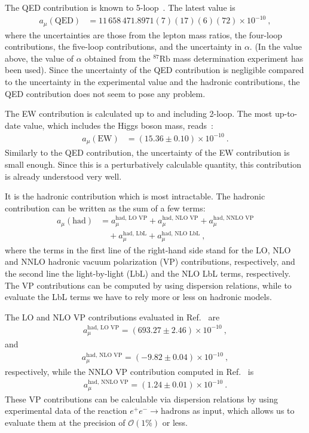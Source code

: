 The QED contribution is known to 5-loop~\cite{Aoyama-etal-2017}. 
The latest value is
%
\begin{align}
 a_\mu(\text{QED}) &=
  11 \, 658 \, 471.8971 (7)(17)(6)(72) \times 10^{-10} ~,
\label{eq:a_mu_QED}
\end{align}
%
where the uncertainties are those from the lepton mass ratios,
the four-loop contributions, the five-loop contributions,
and the uncertainty in $\alpha$.  (In the value above, the
value of $\alpha$ obtained from the ${}^{87}\text{Rb}$ mass
determination experiment has been used).  Since the uncertainty
of the QED contribution is negligible compared to the uncertainty 
in the experimental value and the hadronic contributions,
the QED contribution does not seem to pose any problem.


The EW contribution is calculated up to and including
2-loop.  The most up-to-date value, which includes 
the Higgs boson mass, reads~\cite{Gnendiger-etal}:
%
\begin{align}
 a_\mu(\text{EW}) &=  (15.36 \pm 0.10) \times 10^{-10} ~.
\label{eq:a_mu_EW}
\end{align}
%
Similarly to the QED contribution, the uncertainty of the EW
contribution is small enough.  Since this is a perturbatively
calculable quantity, this contribution is already understood
very well.

It is the hadronic contribution which is most intractable.
The hadronic contribution can be written as the sum of a 
few terms:
%
\begin{align}
   a_\mu(\text{had})
&= a_\mu^{\text{had, LO VP}} +  a_\mu^{\text{had, NLO VP}}
+  a_\mu^{\text{had, NNLO VP}} \nonumber \\
%
&\quad + a_\mu^{\text{had, LbL}} +  a_\mu^{\text{had, NLO LbL}}~,
%
\end{align}
%
where the terms in the first line of the right-hand side stand
for the LO, NLO and NNLO hadronic vacuum polarization (VP)
contributions, respectively, and the second line
the light-by-light (LbL) and the NLO LbL terms, respectively.
The VP contributions can be computed by using dispersion 
relations, while to evaluate the LbL terms we have to 
rely more or less on hadronic models.

The LO and NLO VP contributions evaluated in Ref.~\cite{KNT18}
are 
%
\begin{align}
 a_\mu^{\text{had, LO VP}}= (693.27 \pm 2.46) \times 10^{-10}~, 
\label{eq:a_mu_hadLOVP}
\end{align}
%
and
%
\begin{align}
a_\mu^{\text{had, NLO VP}}= (-9.82 \pm 0.04) \times 10^{-10}~, 
\label{eq:a_mu_hadNLOVP}
\end{align}
%
respectively, while the NNLO VP contribution computed 
in Ref.~\cite{Kurz-etal-hadNNLO} is
%
\begin{align}
a_\mu^{\text{had, NNLO VP}}= (1.24 \pm 0.01) \times 10^{-10}~.
\label{eq:a_mu_hadNNLOVP}
\end{align}
%
These VP contributions can be calculable via dispersion relations
by using experimental data of the reaction
$e^+e^- \to \text{hadrons}$ as input, 
which allows us to evaluate them at the precision of 
${\mathcal O}(1\%)$ or less.

